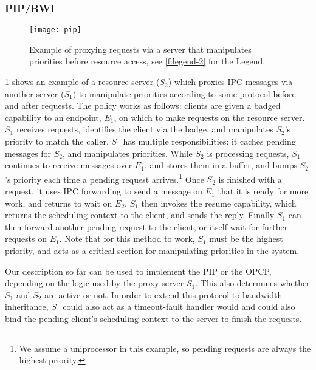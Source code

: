 \subsubsection{\gls{PIP}/\gls{BWI}}
\label{sec:model-pip-bwi}

\begin{figure}
    \centering
    \texttt{[image: pip]}
    \caption[Example of proxying requests via a server.]{Example of proxying requests via a server that manipulates priorities before resource
    access, see \cref{f:legend-2} for the Legend.}
    \label{f:model-pip}
\end{figure}
 
\cref{f:model-pip} shows an example of a resource server ($S_{2}$) which proxies \gls{IPC} messages via
another server ($S_{1}$) to manipulate priorities according to some protocol before and after
requests. The policy works as follows: clients are given a badged capability to an endpoint,
$E_{1}$, on which to make requests on the resource server. $S_{1}$ receives requests, identifies 
the client via the badge, and manipulates $S_{2}$'s priority to match the caller. $S_{1}$ has
multiple responsibilities: it caches pending messages for $S_{2}$, and manipulates priorities.
While $S_{2}$ is processing requests, $S_{1}$ continues to receive messages over $E_{1}$, and stores
them in a buffer, and bumps $S_{2}$'s priority each time a pending request arrives.\footnote{We
assume a uniprocessor in this example, so pending requests are always the highest priority.}
Once $S_{2}$ is finished with a request, it uses \gls{IPC} forwarding to send a
message on $E_{1}$ that it is ready for more work, and returns to wait on $E_{2}$.
$S_{1}$ then invokes the resume capability, which returns the scheduling context to the client, and
sends the reply. Finally $S_{1}$ can then forward another pending request to the client, or itself
wait for further requests on $E_{1}$. Note that for this
method to work, $S_{1}$ must be the highest priority, and acts as a critical section for
manipulating priorities in the system. 

Our description so far can be used to implement the \gls{PIP} or the \gls{OPCP}, depending on 
the logic used by the proxy-server $S_{1}$. This also determines whether $S_{1}$ and $S_{2}$ are active or
not. In order to extend this protocol to bandwidth inheritance, $S_{1}$ could also act as a timeout-fault
handler would and could also bind the pending client's scheduling
context to the server to finish the requests. 


